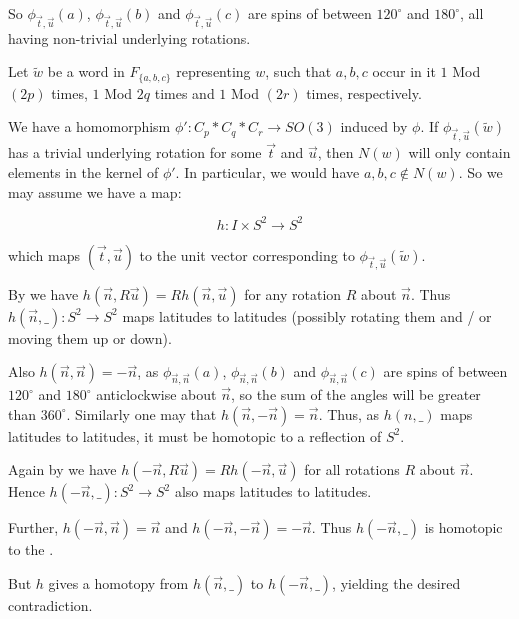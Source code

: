 \documentclass[12pt]{article}
\begin{document}
So $\phi_{\vec{t},\vec{u}}(a)$, $\phi_{\vec{t},\vec{u}}(b)$ and
$\phi_{\vec{t},\vec{u}}(c)$ are spins of between $120^\circ$ and
$180^\circ$, all having non-trivial underlying rotations.  

Let $\tilde{w}$ be a word in $F_{\{a,b,c\}}$ representing $w$, such that $a,b,c$ occur in it $1$ Mod $(2p)$ times, $1$ Mod $2q$ times and $1$ Mod $(2r)$ times, respectively.  

We have a homomorphism $\phi':C_p*C_q*C_r \to SO(3)$ induced by $\phi$.  If
$\phi_{\vec{t},\vec{u}}(\tilde{w})$ has a trivial underlying rotation for
some $\vec{t}$ and $\vec{u}$, then $N(w)$ will only contain
elements in the kernel of $\phi'$. In particular, we would have $a, b, c \notin N(w)$.  So
we may assume we have a map:


$$h\colon I \times S^2 \to S^2$$

\noindent which maps $(\vec{t}, \vec{u})$ to the unit vector corresponding to
$\phi_{\vec{t},\vec{u}}(\tilde{w})$.

By  we have $h(\vec{n}, R\vec{u}) = Rh(\vec{n},\vec{u})$
for any rotation $R$ about $\vec{n}$.  Thus $h(\vec{n}, \_ )\colon
S^2 \to S^2$ maps latitudes to latitudes (possibly rotating them
and / or moving them up or down).



Also $h(\vec{n},\vec{n}) = -\vec{n}$, as
$\phi_{\vec{n},\vec{n}}(a)$, $\phi_{\vec{n},\vec{n}}(b)$ and
$\phi_{\vec{n},\vec{n}}(c)$ are spins of between $120^\circ$ and
$180^\circ$ anticlockwise about $\vec{n}$, so the sum of the
angles will be greater than $360^\circ$.  Similarly one may
 that $h(\vec{n},-\vec{n}) = \vec{n}$. Thus, as $h(n,
\_)$ maps latitudes to latitudes, it must be homotopic to a
reflection of $S^2$.

Again by  we have $h(-\vec{n}, R\vec{u}) =
Rh(-\vec{n},\vec{u})$ for all rotations $R$ about $\vec{n}$.
Hence $h(-\vec{n}, \_)\colon S^2 \to S^2$ also maps latitudes to
latitudes.

Further, $h(-\vec{n},\vec{n}) = \vec{n}$ and $h(-\vec{n},-\vec{n})
= -\vec{n}$.  Thus $h(-\vec{n}, \_)$ is homotopic to the .



But $h$ gives a homotopy from $h(\vec{n}, \_)$ to $h(-\vec{n},
\_)$, yielding the desired contradiction.
\end{document}
